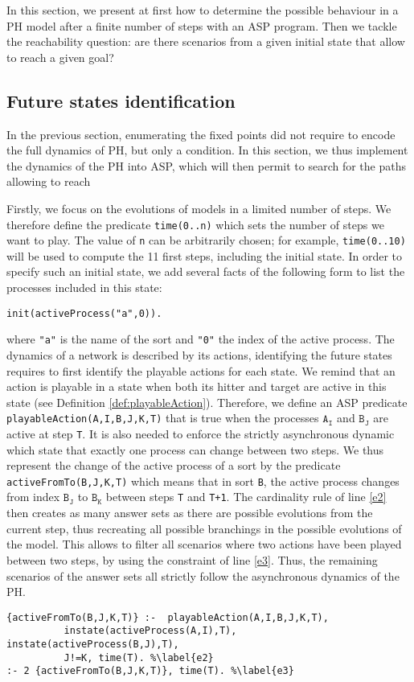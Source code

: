 
In this section, we present at first how to determine the possible behaviour in a PH model after a finite number of steps with an ASP program.
Then we tackle the reachability question: are there scenarios from a given initial state
that allow to reach a given goal?

\subsection{Future states identification}
In the previous section, enumerating the fixed points did not require to
encode the full dynamics of PH, but only a condition.
In this section, we thus implement the dynamics of the PH into ASP,
which will then permit to search for the paths allowing to reach

Firstly, we focus on the evolutions of models in a limited number of steps.
We therefore define the predicate \texttt{time(0..n)} which sets the number of steps we want to play.
The value of \texttt{n} can be arbitrarily chosen;
for example, \texttt{time(0..10)} will be used to compute the 11 first steps,
including the initial state.
In order to specify such an initial state, we add several facts of the following form
to list the processes included in this state:
\begin{lstlisting}
init(activeProcess("a",0)).
\end{lstlisting}
where \texttt{"a"} is the name of the sort and \texttt{"0"} the index of the active process.
The dynamics of a network is described by its actions,
identifying the future states requires to first identify the playable actions for each state.
We remind that an action is playable in a state when both its hitter and target are active in this state (see Definition \ref{def:playableAction}).
Therefore, we define an ASP predicate \texttt{playableAction(A,I,B,J,K,T)} that is true
when the processes $\texttt{A}_\texttt{I}$ and $\texttt{B}_\texttt{J}$ are active at step \texttt{T}.
It is also needed to enforce the strictly asynchronous dynamic
which state that exactly one process can change between two steps.
We thus represent the change of the active process of a sort
by the predicate \texttt{activeFromTo(B,J,K,T)}
which means that in sort \texttt{B}, the active process changes from index $\texttt{B}_\texttt{J}$ to $\texttt{B}_\texttt{K}$ between steps \texttt{T} and \texttt{T+1}.
The cardinality rule of line \ref{e2} then
creates as many answer sets as there are possible evolutions from the current step,
thus recreating all possible branchings in the possible evolutions of the model.
This allows to filter all scenarios where two actions have been played between
two steps, by using the constraint of line \ref{e3}.
Thus, the remaining scenarios of the answer sets all strictly follow
the asynchronous dynamics of the PH.
\begin{lstlisting}
{activeFromTo(B,J,K,T)} :-  playableAction(A,I,B,J,K,T),
          instate(activeProcess(A,I),T), instate(activeProcess(B,J),T),
          J!=K, time(T). %\label{e2}
:- 2 {activeFromTo(B,J,K,T)}, time(T). %\label{e3}
\end{lstlisting}

